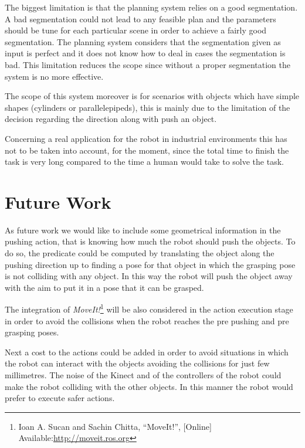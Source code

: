 The biggest limitation is that the planning system relies on a good segmentation. A bad segmentation could not lead to any feasible plan and the parameters should be tune for each particular scene in order to achieve a fairly good segmentation. The planning system considers that the segmentation given as input is perfect and it does not know how to deal in cases the segmentation is bad. This limitation reduces the scope since without a proper segmentation the system is no more effective. 

The scope of this system moreover is for scenarios with objects which have simple shapes (cylinders or parallelepipeds), this is mainly due to the limitation of the decision regarding the direction along with push an object.  

Concerning a real application for the robot in industrial environments this has not to be taken into account, for the moment, since the total time to finish the task is very long compared to the time a human would take to solve the task.

\section*{Future Work}
As future work we would like to include some geometrical information in the pushing action, that is knowing how much the robot should push the objects. To do so, the  predicate could be computed by translating the object along the pushing direction up to finding a pose for that object in which the grasping pose is not colliding with any object. In this way the robot will push the object away with the aim to put it in a pose that it can be grasped.

The integration of \textit{MoveIt!}\footnote{Ioan A. Sucan and Sachin Chitta, “MoveIt!”, [Online] Available:\href{http://moveit.ros.org} {\url{http://moveit.ros.org}}} will be also considered in the action execution stage in order to avoid the collisions when the robot reaches the pre pushing and pre grasping poses. 

Next a cost to the actions could be added in order to avoid situations in which the robot can interact with the objects avoiding the collisions for just few millimetres. The noise of the Kinect and of the controllers of the robot could make the robot colliding with the other objects. In this manner the robot would prefer to execute safer actions. 